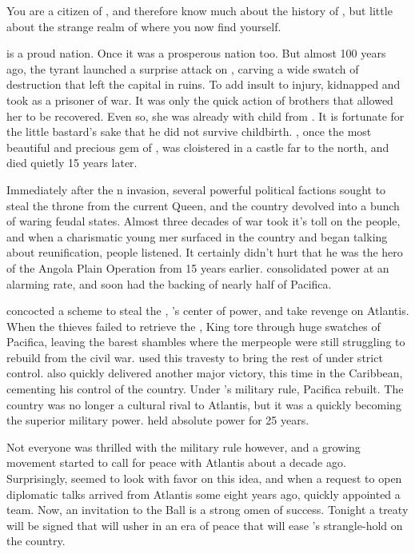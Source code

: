 \documentclass[blue]{NeptuneBall}
\begin{document}
\name{\bPacifican{}}

You are a citizen of \pPacifica{}, and therefore know much about the history of \pPacifica{}, but little about the strange realm of \pAtlantis{} where you now find yourself.

\pPacifica{} is a proud nation. Once it was a prosperous nation too. But almost 100 years ago, the tyrant \cExExKing{\MYname{}} launched a surprise attack on \pPacifica{}, carving a wide swatch of destruction that left the capital in ruins. To add insult to injury, \cExExKing{} kidnapped \cMother{\Prince} \cMother{\MYname{}} and took \cMother{\them} as a prisoner of war. It was only the quick action of \cMother{\them} brothers that allowed her to be recovered. Even so, she was already with child from \cExExKing{}. It is fortunate for the little bastard's sake that he did not survive childbirth. \cMother{}, once the most beautiful and precious gem of \pPacifica{}, was cloistered in a castle far to the north, and died quietly 15 years later.

Immediately after the \pAtlantis{}n invasion, several powerful political factions sought to steal the throne from the current Queen, and the country devolved into a bunch of waring feudal states. Almost three decades of war took it's toll on the people, and when a charismatic young mer\cPacificanRuler{\human{}} surfaced in the country and began talking about reunification, people listened. It certainly didn't hurt that he was the hero of the Angola Plain Operation from 15 years earlier. \cPacificanRuler{\MYname{}} consolidated power at an alarming rate, and soon had the backing of nearly half of Pacifica.

\cPacificanRuler{\They{}} concocted a scheme to steal the \iTriton{\MYname{}}, \cKing{}'s center of power, and take revenge on Atlantis. When the thieves failed to retrieve the \iTriton{\MYname{}}, King \cKing{\MYname{}} tore through huge swatches of Pacifica, leaving the barest shambles where the merpeople were still struggling to rebuild from the civil war. \cPacificanRuler{\MYname{}} used this travesty to bring the rest of \pPacifica{} under \cPacificanRuler{\their{}} strict control. \cPacificanRuler{} also quickly delivered another major victory, this time in the Caribbean, cementing his control of the country. Under \cPacificanRuler{\MYname{}}'s military rule, Pacifica rebuilt. The country was no longer a cultural rival to Atlantis, but it was a quickly becoming the superior military power. \cPacificanRuler{}  held absolute power for 25 years.

Not everyone was thrilled with the military rule however, and a growing movement started to call for peace with Atlantis about a decade ago. Surprisingly, \cPacificanRuler{\MYname{}} seemed to look with favor on this idea, and when a request to open diplomatic talks arrived from Atlantis some eight years ago, \cPacificanRuler{\they{}} quickly appointed a team. Now, an invitation to the \cExKing{\MYname{}} Ball is a strong omen of success. Tonight a treaty will be signed that will usher in an era of peace that will ease \cPacificanRuler{\MYname{}}'s strangle-hold on the country.
\end{document}
